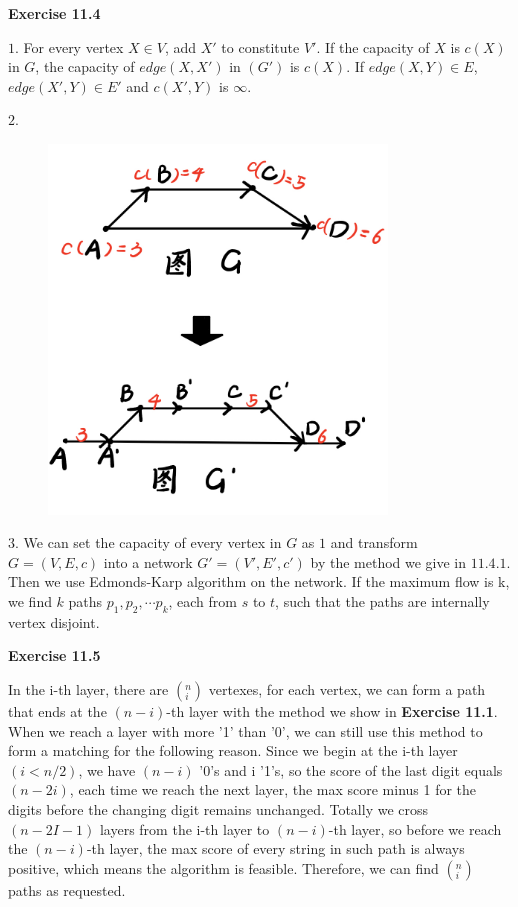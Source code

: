 \documentclass{article} %
\begin{document}
\textbf{Exercise 11.4}\par
    $1.$ For every vertex $X \in V$, add $X\prime$ to constitute $V\prime$. If the capacity of $X$ is $c(X)$ in $G$, the capacity of $edge(X,X\prime)$ in $(G\prime)$ is $c(X).$ If $edge(X,Y)\in E$, $edge(X\prime,Y)\in E\prime$ and $c(X\prime,Y)$ is $\infty$.\par
    $2.$
    \begin{figure}[H]
  	\centering
  	\includegraphics[width=9cm]{11_4_2.png}
  	\caption{}
  	\label{}
  	\end{figure}
    
    
    $3.$ We can set the capacity of every vertex in $G$ as $1$ and transform $G = (V,E,c)$ into a network $G\prime = (V\prime,E\prime,c\prime)$ by the method we give in $11.4.1$. Then we use Edmonds-Karp algorithm on the network. If the maximum flow is k, we find $k$ paths $p_1,p_2,\cdots p_k$, each from $s$ to $t$, such that the paths are internally vertex disjoint.

    \textbf{Exercise 11.5}\par	
	In the i-th layer, there are $(^n _i)$ vertexes, for each vertex, we can form a path that ends at the $(n-i)$-th layer with the method we show in \textbf{Exercise 11.1}. When we reach a layer with more '1' than '0', we can still use this method to form a matching for the following reason. Since we begin at the i-th layer$(i<n/2)$, we have $(n-i)$ '0's and i '1's, so the score of the last digit equals $(n-2i)$, each time we reach the next layer, the max score minus 1 for the  digits before the changing digit remains unchanged. Totally we cross $(n-2I-1)$ layers from the i-th layer to $(n-i)$-th layer, so before we reach the $(n-i)$-th layer, the max score of every string in such path is always positive, which means the algorithm is feasible. Therefore, we can find $(^n _i)$ paths as requested.
\end{document}
